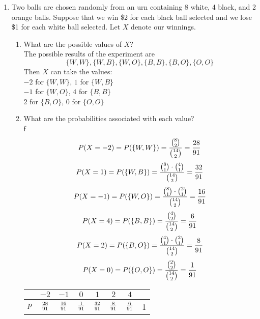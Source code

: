 \documentclass[12pt]{article}%
\newcommand{\0}{{\bf 0}}
\begin{document}
\begin{enumerate}
\begin{table}[H]
\begin{tabular}{|c||c|c|c|c||c|}
\end{tabular}\vspace{3mm}
\end{table}













\item
Two balls are chosen randomly from an urn containing 8 white, 4 black, and 2 orange balls. 
Suppose that we win \$2 for each black ball selected and we lose \$1 for each white ball selected. 
Let $X$ denote our winnings. 
\begin{enumerate}
\item What are the possible values of $X$?
\\
{\color{blue}{\bf Sol.}}
The possible results of the experiment are \\
$$\{W,W \}, \{W,B \}, \{W,O \}, \{B,B \}, \{B,O \}, \{O,O \}$$
Then $X$ can take the values:\\
$-2$ for $\{W,W \}$, $1$ for $\{W,B \}$\\
$-1$ for $\{W,O \}$, $4$ for $\{B,B \}$\\
$2$ for $\{B,O \}$, $0$ for $\{O,O \}$\\
\item What are the probabilities associated with each value?
\\
{\color{blue}{\bf Sol.}}f
$$P(X=-2)=P(\{W,W\})=\frac{{8 \choose 2}}{{14 \choose 2}}=\frac{28}{91}$$
$$P(X=1)=P(\{W,B\})=\frac{{8 \choose 1}\cdot {4 \choose 1}}{{14 \choose 2}}=\frac{32}{91}$$
$$P(X=-1)=P(\{W,O\})=\frac{{8 \choose 1}\cdot {2 \choose 1}}{{14 \choose 2}}=\frac{16}{91}$$
$$P(X=4)=P(\{B,B\})=\frac{{4 \choose 2}}{{14 \choose 2}}=\frac{6}{91}$$
$$P(X=2)=P(\{B,O\})=\frac{{4 \choose 1}\cdot {2 \choose 1}}{{14 \choose 2}}=\frac{8}{91}$$
$$P(X=0)=P(\{O,O\})=\frac{{2 \choose 2}}{{14 \choose 2}}=\frac{1}{91}$$



\begin{table}[H]    \center
\begin{tabular}{|c||c|c|c|c|c|c||c|} \hline
                   & $-2$                & $-1$   &  $0$      &   $1$   &$2$   & $4$  & \\
\hline 
$p$    & $\frac{28}{91}$  & $\frac{16}{91}$&$\frac{1}{91}$&$\frac{32}{91}$    &   $\frac{8}{91}$    &$\frac{6}{91}$  &1\\
\hline




\end{tabular}
\end{table}
\end{enumerate}
\end{enumerate}
\end{document}
